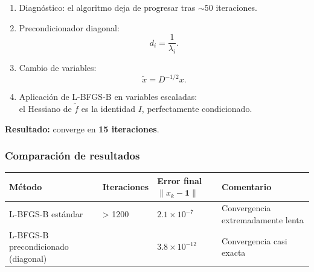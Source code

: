 \documentclass[
  spanish,
  us-letterpaper,
]{scrreprt}
\providecommand{\tightlist}{%
  \setlength{\itemsep}{0pt}\setlength{\parskip}{0pt}}
\numberwithin{equation}{section}
\begin{document}
\begin{enumerate}
\def\labelenumi{\arabic{enumi}.}
\tightlist
\item
  Diagnóstico: el algoritmo deja de progresar tras \(\sim 50\)
  iteraciones.\\
\item
  Precondicionador diagonal: \[
  d_i = \frac{1}{\lambda_i}.
  \]
\item
  Cambio de variables: \[
  \tilde{x} = D^{-1/2} x.
  \]
\item
  Aplicación de L-BFGS-B en variables escaladas:\\
  el Hessiano de \(\tilde{f}\) es la identidad \(I\), perfectamente
  condicionado.
\end{enumerate}

\textbf{Resultado:} converge en \textbf{15 iteraciones}.

\subsubsection{Comparación de
resultados}\label{comparaciuxf3n-de-resultados}

\begin{longtable}[]{@{}
  >{\raggedright\arraybackslash}p{}
  >{\raggedright\arraybackslash}p{}
  >{\raggedright\arraybackslash}p{}
  >{\raggedright\arraybackslash}p{}@{}}
\toprule\noalign{}
\begin{minipage}[b]{\linewidth}\raggedright
Método
\end{minipage} & \begin{minipage}[b]{\linewidth}\raggedright
Iteraciones
\end{minipage} & \begin{minipage}[b]{\linewidth}\raggedright
Error final \(\|x_k - \mathbf{1}\|\)
\end{minipage} & \begin{minipage}[b]{\linewidth}\raggedright
Comentario
\end{minipage} \\
\midrule\noalign{}
\endhead
\bottomrule\noalign{}
\endlastfoot
L-BFGS-B estándar & \textgreater{} 1200 & \(2.1 \times 10^{-7}\) &
Convergencia extremadamente lenta \\
L-BFGS-B precondicionado (diagonal) & 15 & \(3.8 \times 10^{-12}\) &
Convergencia casi exacta \\
\end{longtable}
\end{document}
